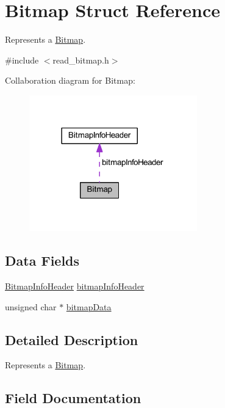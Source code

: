 \hypertarget{struct_bitmap}{}\section{Bitmap Struct Reference}
\label{struct_bitmap}


Represents a \hyperlink{struct_bitmap}{Bitmap}.  




{\ttfamily \#include $<$read\+\_\+bitmap.\+h$>$}



Collaboration diagram for Bitmap\+:
\nopagebreak
\begin{figure}[H]
\begin{center}
\leavevmode
\includegraphics[width=206pt]{struct_bitmap__coll__graph}
\end{center}
\end{figure}
\subsection*{Data Fields}
\begin{DoxyCompactItemize}
\item 
\hyperlink{struct_bitmap_info_header}{Bitmap\+Info\+Header} \hyperlink{struct_bitmap_a7157ca7f3ce4be47481c472fafd89313}{bitmap\+Info\+Header}
\item 
unsigned char $\ast$ \hyperlink{struct_bitmap_a586c4bcc42cf22a033e8f60f24f627f0}{bitmap\+Data}
\end{DoxyCompactItemize}


\subsection{Detailed Description}
Represents a \hyperlink{struct_bitmap}{Bitmap}. 

\subsection{Field Documentation}
\hypertarget{struct_bitmap_a586c4bcc42cf22a033e8f60f24f627f0}{}\label{struct_bitmap_a586c4bcc42cf22a033e8f60f24f627f0} 
